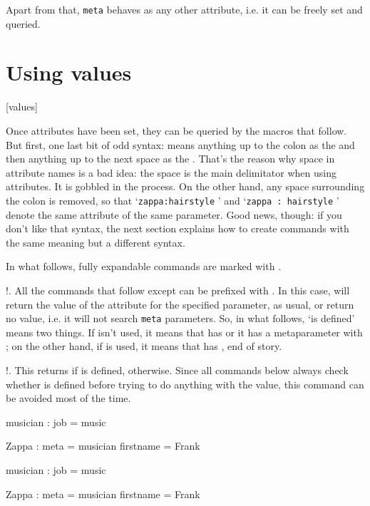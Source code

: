 Apart from that, \verb/meta/ behaves as any other attribute, i.e. it can
be freely set and queried.








\section{Using values}[values]

\noindent Once attributes have been set, they can be queried by the macros
that follow. But first, one last bit of odd syntax: \paramatt means anything
up to the colon as the \param and then anything up to the next space as 
the \attr. That's the reason why space in attribute names is a bad idea:
the space is the main delimitator when using attributes. It is gobbled
in the process. On the other hand,
any space surrounding the colon is removed, so that `\verb/zappa:hairstyle/ '
and `\verb/zappa : hairstyle/ ' denote the same attribute of the same parameter.
Good news, though: if you don't like that syntax, the next section explains
how to create commands with the same meaning but a different syntax.

In what follows, fully expandable commands are marked with \color{.8 0 0}{\char"E01F}.

\describe*!\nometa{}.
All the commands that follow except \com\parameterloop can be prefixed with \com\nometa. In this case,
\yax will return the value of the attribute for the specified parameter,
as usual, or return no value, i.e. it will not search \verb/meta/ parameters.	
So, in what follows, `\paramatt is defined' means two things. If \com\nometa
isn't used, it means that \param has \attr or it has a metaparameter with
\attr; on the other hand, if \com\nometa is used, it means that \param has
\attr, end of story.

\describe*!\ifattribute\paramatt\true\false.
This returns \true if \paramatt is defined, \false otherwise. Since all
commands below always check whether \paramatt is defined before trying
to do anything with the value, this command can be avoided most of the
time.

\setparameter musician :
  job = music

\setparameter Zappa :
  meta      = musician
  firstname = Frank


\Example
\setparameter musician : job = music\par
\setparameter Zappa :
  meta      = musician
  firstname = Frank

